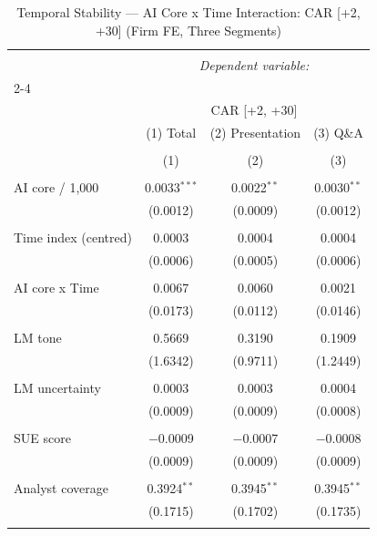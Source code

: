 
\begin{table}[!htbp] \centering 
  \caption{Temporal Stability — AI Core x Time Interaction: CAR [+2, +30] (Firm FE, Three Segments)} 
  \label{} 
\begin{tabular}{@{\extracolsep{5pt}}lccc} 
\\[-1.8ex]\hline 
\hline \\[-1.8ex] 
 & \multicolumn{3}{c}{\textit{Dependent variable:}} \\ 
\cline{2-4} 
\\[-1.8ex] & \multicolumn{3}{c}{CAR [+2, +30]} \\ 
 & (1) Total & (2) Presentation & (3) Q\&A \\ 
\\[-1.8ex] & (1) & (2) & (3)\\ 
\hline \\[-1.8ex] 
 AI core / 1,000 & 0.0033$^{***}$ & 0.0022$^{**}$ & 0.0030$^{**}$ \\ 
  & (0.0012) & (0.0009) & (0.0012) \\ 
  & & & \\ 
 Time index (centred) & 0.0003 & 0.0004 & 0.0004 \\ 
  & (0.0006) & (0.0005) & (0.0006) \\ 
  & & & \\ 
 AI core x Time & 0.0067 & 0.0060 & 0.0021 \\ 
  & (0.0173) & (0.0112) & (0.0146) \\ 
  & & & \\ 
 LM tone & 0.5669 & 0.3190 & 0.1909 \\ 
  & (1.6342) & (0.9711) & (1.2449) \\ 
  & & & \\ 
 LM uncertainty & 0.0003 & 0.0003 & 0.0004 \\ 
  & (0.0009) & (0.0009) & (0.0008) \\ 
  & & & \\ 
 SUE score & $-$0.0009 & $-$0.0007 & $-$0.0008 \\ 
  & (0.0009) & (0.0009) & (0.0009) \\ 
  & & & \\ 
 Analyst coverage & 0.3924$^{**}$ & 0.3945$^{**}$ & 0.3945$^{**}$ \\ 
  & (0.1715) & (0.1702) & (0.1735) \\ 
  & & & \\ 

\end{tabular}
\end{table}

